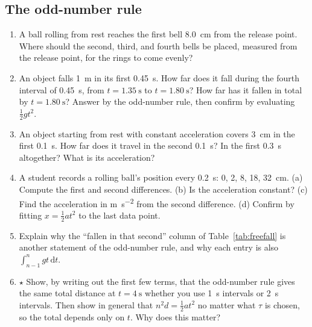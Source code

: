 \documentclass[11pt,twoside,openany]{book}
\newcommand{\dd}{\mathrm{d}}
\begin{document}
\subsection*{The odd-number rule}
\begin{enumerate}[label=\textbf{\thechapter.\arabic*},resume=exercises,leftmargin=*]
  \item A ball rolling from rest reaches the first bell \SI{8.0}{\centi\metre} from the release point. Where should the second, third, and fourth bells be placed, measured from the release point, for the rings to come evenly?
  \item An object falls \SI{1}{\metre} in its first \SI{0.45}{\second}. How far does it fall during the fourth interval of \SI{0.45}{\second}, from $t = \SI{1.35}{\second}$ to $t = \SI{1.80}{\second}$? How far has it fallen in total by $t = \SI{1.80}{\second}$? Answer by the odd-number rule, then confirm by evaluating $\tfrac12 g t^2$.
  \item An object starting from rest with constant acceleration covers \SI{3}{\centi\metre} in the first \SI{0.1}{\second}. How far does it travel in the second \SI{0.1}{\second}? In the first \SI{0.3}{\second} altogether? What is its acceleration?
  \item A student records a rolling ball's position every \SI{0.2}{\second}: \num{0}, \num{2}, \num{8}, \num{18}, \num{32}~cm. (a) Compute the first and second differences. (b) Is the acceleration constant? (c) Find the acceleration in \si{\metre\per\second\squared} from the second difference. (d) Confirm by fitting $x = \tfrac12 a t^2$ to the last data point.
  \item Explain why the ``fallen in that second'' column of Table~\ref{tab:freefall} is another statement of the odd-number rule, and why each entry is also $\int_{n-1}^{n} gt\,\dd t$.
  \item $\star$ Show, by writing out the first few terms, that the odd-number rule gives the same total distance at $t = \SI{4}{\second}$ whether you use \SI{1}{\second} intervals or \SI{2}{\second} intervals. Then show in general that $n^2 d = \tfrac12 a t^2$ no matter what $\tau$ is chosen, so the total depends only on $t$. Why does this matter?\label{ex:leonardo}
\end{enumerate}
\end{document}
